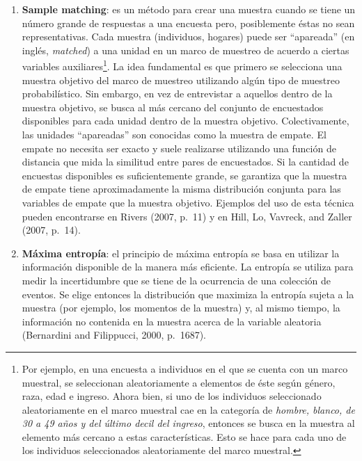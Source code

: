 \documentclass[]{article}
\let\rmarkdownfootnote\footnote%
\def\footnote{\protect\rmarkdownfootnote}
\begin{document}
\begin{enumerate}
\def\labelenumi{\arabic{enumi}.}
\itemsep1pt\parskip0pt
\item
  \textbf{Sample matching}: es un método para crear una muestra cuando
  se tiene un número grande de respuestas a una encuesta pero,
  posiblemente éstas no sean representativas. Cada muestra (individuos,
  hogares) puede ser ``apareada'' (en inglés, \emph{matched}) a una
  unidad en un marco de muestreo de acuerdo a ciertas variables
  auxiliares\footnote{Por ejemplo, en una encuesta a individuos en el
    que se cuenta con un marco muestral, se seleccionan aleatoriamente a
    elementos de éste según género, raza, edad e ingreso. Ahora bien, si
    uno de los individuos seleccionado aleatoriamente en el marco
    muestral cae en la categoría de \emph{hombre, blanco, de 30 a 49
    años y del último decil del ingreso}, entonces se busca en la
    muestra al elemento más cercano a estas características. Esto se
    hace para cada uno de los individuos seleccionados aleatoriamente
    del marco muestral.}. La idea fundamental es que primero se
  selecciona una muestra objetivo del marco de muestreo utilizando algún
  tipo de muestreo probabilístico. Sin embargo, en vez de entrevistar a
  aquellos dentro de la muestra objetivo, se busca al más cercano del
  conjunto de encuestados disponibles para cada unidad dentro de la
  muestra objetivo. Colectivamente, las unidades ``apareadas'' son
  conocidas como la muestra de empate. El empate no necesita ser exacto
  y suele realizarse utilizando una función de distancia que mida la
  similitud entre pares de encuestados. Si la cantidad de encuestas
  disponibles es suficientemente grande, se garantiza que la muestra de
  empate tiene aproximadamente la misma distribución conjunta para las
  variables de empate que la muestra objetivo. Ejemplos del uso de esta
  técnica pueden encontrarse en Rivers (2007, p.~11) y en Hill, Lo,
  Vavreck, and Zaller (2007, p.~14).
\item
  \textbf{Máxima entropía}: el principio de máxima entropía se basa en
  utilizar la información disponible de la manera más eficiente. La
  entropía se utiliza para medir la incertidumbre que se tiene de la
  ocurrencia de una colección de eventos. Se elige entonces la
  distribución que maximiza la entropía sujeta a la muestra (por
  ejemplo, los momentos de la muestra) y, al mismo tiempo, la
  información no contenida en la muestra acerca de la variable aleatoria
  (Bernardini and Filippucci, 2000, p.~1687).
\end{enumerate}
\end{document}
